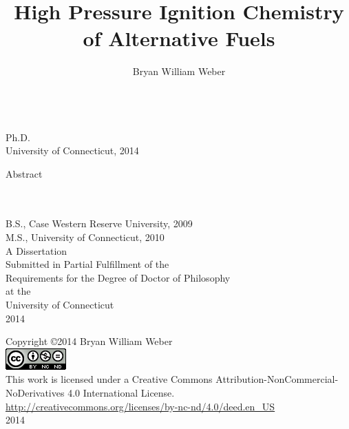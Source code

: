\documentclass[12pt]{report}
\title{High Pressure Ignition Chemistry of Alternative Fuels}
\author{Bryan William Weber}
\newcommand{\blankline}{\vspace*{\baselineskip}}
\begin{document}
\thispagestyle{empty}
\begin{center}
\thetitle \\
\theauthor Ph.D. \\
University of Connecticut, 2014 \\
\blankline
\end{center}
Abstract

\newpage

\thispagestyle{empty}
\begin{center}
\blankline \blankline 
\thetitle \\
\blankline
\theauthor \\
\blankline \blankline
B.S., Case Western Reserve University, 2009 \\
M.S., University of Connecticut, 2010 \\
\blankline \blankline \blankline \blankline \blankline \blankline
\blankline \blankline
A Dissertation \\
Submitted in Partial Fulfillment of the \\
Requirements for the Degree of Doctor of Philosophy \\
at the \\
University of Connecticut \\
\blankline \blankline
2014
\end{center}
\newpage

\thispagestyle{empty}
\begin{center}
Copyright \copyright 2014 Bryan William Weber \\
\includegraphics{images/CC-license.png} \\
\blankline
This work is licensed under a Creative Commons Attribution-NonCommercial-NoDerivatives 4.0 International License. \\
\url{http://creativecommons.org/licenses/by-nc-nd/4.0/deed.en_US} \\
\blankline \blankline \blankline \blankline \blankline \blankline
\blankline \blankline \blankline \blankline \blankline \blankline
\blankline \blankline \blankline \blankline \blankline \blankline
\blankline \blankline
2014
\end{center}
\newpage
\end{document}
